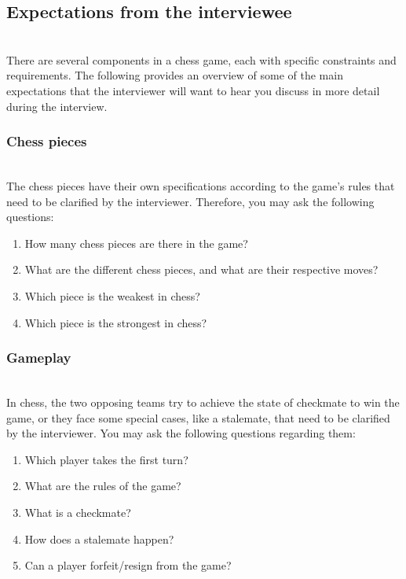 \subsection{Expectations from the interviewee}\label{3pZ0V0TX6jB71x2_DAAtL}
\\
There are several components in a chess game, each with specific constraints and requirements. The following provides an overview of some of the main expectations that the interviewer will want to hear you discuss in more detail during the interview.

\subsubsection{Chess pieces}\label{gPS6TUwl2cvcfAz8lu2Jh}
\\
The chess pieces have their own specifications according to the game's rules that need to be clarified by the interviewer. Therefore, you may ask the following questions:

\begin{enumerate}
\item
\protect{}\label{OGcsdcVguY4VySnMiKL2U}
How many chess pieces are there in the game?
\item
\protect{}\label{Upn_ptB_5TJc9Ec_1gKg3}
What are the different chess pieces, and what are their respective moves?
\item
\protect{}\label{AOy66guLpze6VnIteF2ll}
Which piece is the weakest in chess?
\item
\protect{}\label{XDUifB6BRJ1ErADGZwSHN}
Which piece is the strongest in chess?
\end{enumerate}

\subsubsection{Gameplay}\label{65gA9Llm3JKPsQp5_metY}
\\
In chess, the two opposing teams try to achieve the state of checkmate to win the game, or they face some special cases, like a stalemate, that need to be clarified by the interviewer. You may ask the following questions regarding them:

\begin{enumerate}
\item
\protect{}\label{GArA5EVwv8QbR5pW21VRB}
Which player takes the first turn?
\item
\protect{}\label{V7vJxQhl2UsIRlkNRVvoY}
What are the rules of the game?
\item
\protect{}\label{BX31--glOLD9_jWu2YAgl}
What is a checkmate?
\item
\protect{}\label{4pZU8UxKJJkYGxOOsPqr8}
How does a stalemate happen?
\item
\protect{}\label{Yq1YN5Z_wougIlwWlW_vK}
Can a player forfeit/resign from the game?
\end{enumerate}

